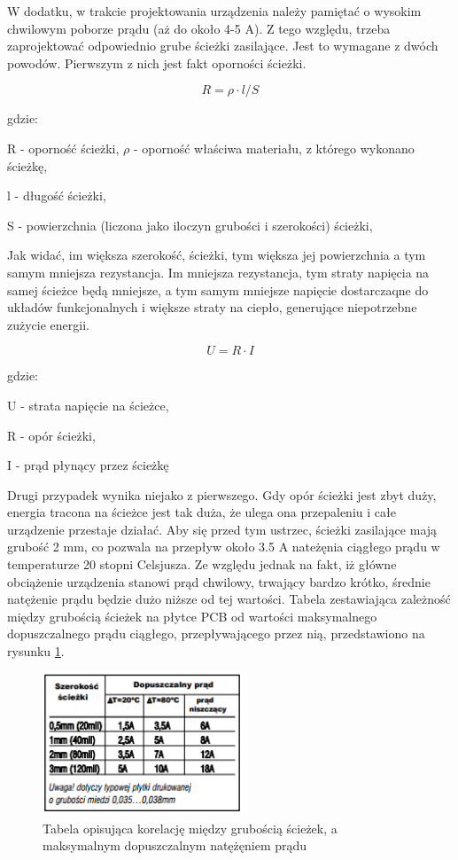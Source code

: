 W dodatku, w trakcie projektowania urządzenia należy pamiętać o wysokim chwilowym poborze prądu (aż do około 4-5 A). Z tego względu, trzeba zaprojektować odpowiednio grube ścieżki zasilające. Jest to wymagane z dwóch powodów. Pierwszym z nich jest fakt oporności ścieżki.

\begin{equation}
 R = \rho \cdot l / S 
 \label{eq_pcb_wire_resistance}
\end{equation}

gdzie:

R - oporność ścieżki,
$\rho$ - oporność właściwa materiału, z którego wykonano ścieżkę,

l - długość ścieżki,

S - powierzchnia (liczona jako iloczyn grubości i szerokości) ścieżki,

Jak widać, im większa szerokość, ścieżki, tym większa jej powierzchnia a tym samym mniejsza rezystancja. Im mniejsza rezystancja, tym straty napięcia na samej ścieżce będą mniejsze, a tym samym mniejsze napięcie dostarczaqne do układów funkcjonalnych i większe straty na ciepło, generujące niepotrzebne zużycie energii.

\begin{equation}
 U = R \cdot I
 \label{eq_voltage_drop_on_pcb_wire} 
\end{equation}

 gdzie:
 
 U - strata napięcie na ścieżce,
 
 R - opór ścieżki,
 
 I - prąd płynący przez ścieżkę
 
\clearpage
Drugi przypadek wynika niejako z pierwszego. Gdy opór ścieżki jest zbyt duży, energia tracona na ścieżce jest tak duża, że ulega ona przepaleniu i całe urządzenie przestaje działać. Aby się przed tym ustrzec, ścieżki zasilające mają grubość 2 mm, co pozwala na przepływ około 3.5 A nateżęnia ciągłego prądu w temperaturze 20 stopni Celsjusza. Ze względu jednak na fakt, iż główne obciążenie urządzenia stanowi prąd chwilowy, trwający bardzo krótko, średnie natężenie prądu będzie dużo niższe od tej wartości. Tabela zestawiająca zależność między grubością ścieżek na płytce PCB od wartości maksymalnego dopuszczalnego prądu ciągłego, przepływającego przez nią, przedstawiono na rysunku \ref{fig:image_pcb_wire_thickness}.

\begin{figure}[H]
	\centering
	\includegraphics[width=6cm]{img/board_layouts/pcb_wire_thickness.png}
	\caption{Tabela opisująca korelację między grubością ścieżek, a maksymalnym dopuszczalnym natężęniem prądu \cite{pcb_wire_thickness}}
	\label{fig:image_pcb_wire_thickness}
\end{figure}
 

